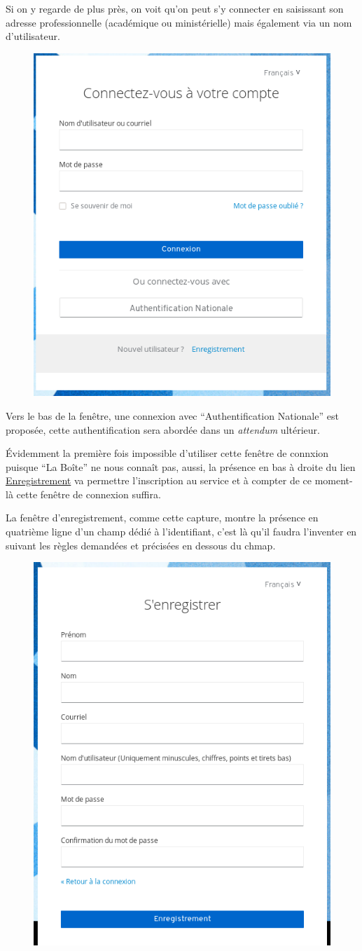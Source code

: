 Si on y regarde de plus près, on voit qu'on peut s'y connecter en saisissant son adresse professionnelle (académique ou ministérielle) mais également via un nom d'utilisateur. 
\begin{figure}
	\centering
	\includegraphics[width=0.500\linewidth]{./Captures/portail.site.web.connexion.zoom.png}
\end{figure}
Vers le bas de la fenêtre, une connexion avec ``Authentification Nationale'' est proposée, cette authentification sera abordée dans un \emph{attendum} ultérieur.

Évidemment la première fois impossible d'utiliser cette fenêtre de connxion puisque ``La Boîte'' ne nous connaît pas, aussi, la présence en bas à droite du lien \href{https://auth.apps.education.fr/auth/realms/apps/login-actions/registration}{Enregistrement} va permettre l'inscription au service et à compter de ce moment-là cette fenêtre de connexion suffira.

La fenêtre d'enregistrement, comme cette capture, montre la présence en quatrième ligne d'un champ dédié à l'identifiant, c'est là qu'il faudra l'inventer en suivant les règles demandées et précisées en dessous du chmap.
\begin{figure}
	\centering
	\includegraphics[width=0.500\linewidth]{./Captures/portail.site.web.enregistrement.png}
	\caption{}
\end{figure}


